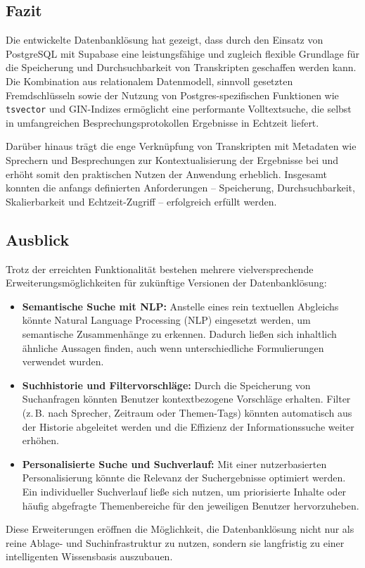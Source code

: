 \subsection{Fazit}
Die entwickelte Datenbanklösung hat gezeigt, dass durch den Einsatz von PostgreSQL
mit Supabase eine leistungsfähige und zugleich flexible Grundlage für die Speicherung
und Durchsuchbarkeit von Transkripten geschaffen werden kann.
Die Kombination aus relationalem Datenmodell, sinnvoll gesetzten Fremdschlüsseln
sowie der Nutzung von Postgres-spezifischen Funktionen wie \texttt{tsvector} und
GIN-Indizes ermöglicht eine performante Volltextsuche, die selbst in umfangreichen
Besprechungsprotokollen Ergebnisse in Echtzeit liefert.

Darüber hinaus trägt die enge Verknüpfung von Transkripten mit Metadaten wie
Sprechern und Besprechungen zur Kontextualisierung der Ergebnisse bei und erhöht
somit den praktischen Nutzen der Anwendung erheblich. Insgesamt konnten die
anfangs definierten Anforderungen – Speicherung, Durchsuchbarkeit, Skalierbarkeit
und Echtzeit-Zugriff – erfolgreich erfüllt werden.

\subsection{Ausblick}
Trotz der erreichten Funktionalität bestehen mehrere vielversprechende
Erweiterungsmöglichkeiten für zukünftige Versionen der Datenbanklösung:

\begin{itemize}
    \item \textbf{Semantische Suche mit \ac{NLP}:}
    Anstelle eines rein textuellen Abgleichs könnte Natural Language Processing (\ac{NLP})
    eingesetzt werden, um semantische Zusammenhänge zu erkennen. Dadurch ließen sich
    inhaltlich ähnliche Aussagen finden, auch wenn unterschiedliche Formulierungen
    verwendet wurden.

    \item \textbf{Suchhistorie und Filtervorschläge:}
    Durch die Speicherung von Suchanfragen könnten Benutzer kontextbezogene
    Vorschläge erhalten. Filter (z.\,B. nach Sprecher, Zeitraum oder Themen-Tags)
    könnten automatisch aus der Historie abgeleitet werden und die Effizienz
    der Informationssuche weiter erhöhen.

    \item \textbf{Personalisierte Suche und Suchverlauf:}
    Mit einer nutzerbasierten Personalisierung könnte die Relevanz der Suchergebnisse
    optimiert werden. Ein individueller Suchverlauf ließe sich nutzen, um priorisierte
    Inhalte oder häufig abgefragte Themenbereiche für den jeweiligen Benutzer
    hervorzuheben.
\end{itemize}

Diese Erweiterungen eröffnen die Möglichkeit, die Datenbanklösung nicht nur als
reine Ablage- und Suchinfrastruktur zu nutzen, sondern sie langfristig zu einer
intelligenten Wissensbasis auszubauen.
